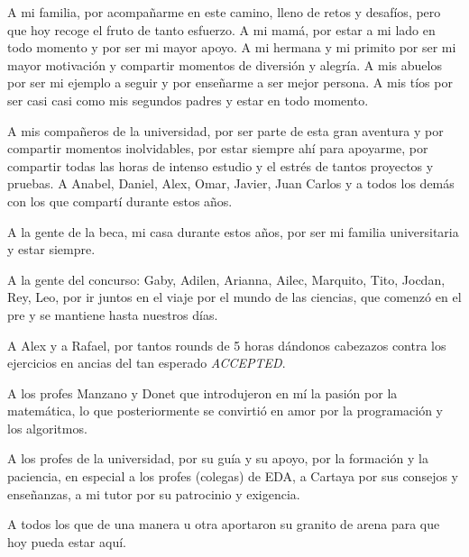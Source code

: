 \begin{acknowledgements}
    A mi familia, por acompañarme en este camino, lleno de retos y desafíos, pero que hoy recoge el fruto de tanto esfuerzo.
    A mi mamá, por estar a mi lado en todo momento y por ser mi mayor apoyo. A mi hermana y mi primito por ser mi mayor motivación y compartir
    momentos de diversión y alegría. A mis abuelos por ser mi ejemplo a seguir y por enseñarme a ser mejor persona.
    A mis tíos por ser casi casi como mis segundos padres y estar en todo momento.
    
    A mis compañeros de la universidad, por ser parte de esta gran aventura y por compartir momentos inolvidables, por 
    estar siempre ahí para apoyarme, por compartir todas las horas de intenso estudio y el estrés de tantos proyectos y pruebas.
    A Anabel, Daniel, Alex, Omar, Javier, Juan Carlos y a todos los demás con los que compartí durante estos años.
    
    A la gente de la beca, mi casa durante estos años, por ser mi familia universitaria y estar siempre.
    
    A la gente del concurso: Gaby, Adilen, Arianna, Ailec, Marquito, Tito, Jocdan, Rey, Leo,  por ir juntos en el viaje por el mundo de las ciencias, que comenzó en el pre y 
    se mantiene hasta nuestros días. 
    
    A Alex y a Rafael, por tantos rounds de 5 horas dándonos cabezazos contra los ejercicios en ancias del tan esperado 
    \textit{ACCEPTED}.
    
    A los profes Manzano y Donet que introdujeron en mí la pasión por la matemática, lo que posteriormente se convirtió
    en amor por la programación y los algoritmos.
    
    A los profes de la universidad, por su guía y su apoyo, por la formación y la paciencia, en especial a los profes (colegas) de EDA,
    a Cartaya por sus consejos y enseñanzas, a mi tutor por su patrocinio y exigencia.
    
    A todos los que de una manera u otra aportaron su granito de arena para que hoy pueda estar aquí.
\end{acknowledgements}
